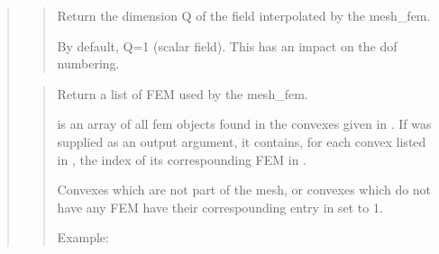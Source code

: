 \documentclass[a4paper,11pt,english]{sphinxmanual}
\begin{document}
\begin{quote}
\sphinxAtStartPar
{}
\begin{quote}

\sphinxAtStartPar
Return the dimension Q of the field interpolated by the mesh\_fem.

\sphinxAtStartPar
By default, Q=1 (scalar field). This has an impact on the dof numbering.
\end{quote}

\sphinxAtStartPar
{}
\begin{quote}

\sphinxAtStartPar
Return a list of FEM used by the mesh\_fem.

\sphinxAtStartPar
{} is an array of all fem objects found in the convexes
given in . If  was supplied as an output argument,
it contains, for each convex listed in , the index of its
correspounding FEM in .

\sphinxAtStartPar
Convexes which are not part of the mesh, or convexes which do not
have any FEM have their correspounding entry in  set to \sphinxhyphen{}1.

\sphinxAtStartPar
Example:

\begin{sphinxVerbatim}[commandchars=\\\{\}]
\PYG{p}{[}\PYG{p}{]} 
   
 
\end{sphinxVerbatim}
\end{quote}


\end{quote}
\end{document}
